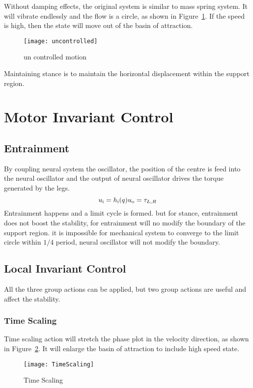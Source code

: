 Without damping effects, the original system is similar to mass spring system.
It will vibrate endlessly and the flow is a circle, as shown in Figure~\ref{fig:stancepostures}.
If the speed is high, then the state will move out of the basin of attraction.
\begin{figure}[!htbp]
  \begin{center}
     \texttt{[image: uncontrolled]}
    \caption{un controlled motion}
    \label{fig:stancepostures}
\end{center}
\end{figure}
Maintaining stance is to maintain the horizontal displacement within the support region.


\section {Motor Invariant Control}
\subsection{Entrainment}
By coupling neural system the oscillator, the position of the centre is feed into the neural oscillator and the output of neural oscillator drives the torque generated by the legs.
\[
u_{\mathrm{i}}=h_{\mathrm{i}}(q)\\
u_{\mathrm{o}}=\tau_{L,R}
\]
Entrainment happens and a limit cycle is formed.
but for stance, entrainment does not boost the stability, for entrainment will no modify the boundary of the support region.
it is impossible for mechanical system to converge to the limit circle within $1/4$ period, neural oscillator will not modify the boundary.


\subsection{Local Invariant Control}
All the three group actions can be applied, but two group actions are useful and affect the stability.
\subsubsection*{Time Scaling}
Time scaling action will stretch the phase plot in the velocity direction, as shown in Figure~\ref{fig:stanceTimeScaling}.
It will enlarge the basin of attraction to include high speed state.
\begin{figure}[!htbp]
  \begin{center}
      \texttt{[image: TimeScaling]}
    \caption{Time Scaling}
    \label{fig:stanceTimeScaling}
\end{center}
\end{figure}



